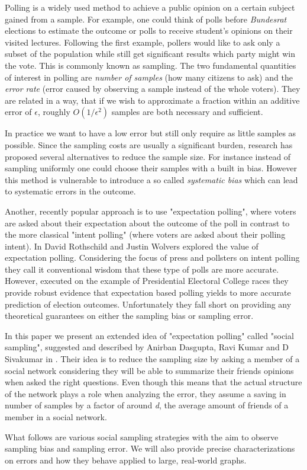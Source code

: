 Polling is a widely used method to achieve a public opinion on a certain subject gained from a sample. For example, one could think of polls before \textit{Bundesrat} elections to estimate the outcome or polls to receive student's opinions on their visited lectures.
Following the first example, pollers would like to ask only a subset of the population while still get significant results which party might win the vote. This is commonly known as sampling.
The two fundamental quantities of interest in polling are \textit{number of samples} (how many citizens to ask) and the \textit{error rate} (error caused by observing a sample instead of the whole voters). They are related in a way, that if we wish to approximate a fraction within an additive error of $\epsilon$, roughly $O(1/\epsilon^{2})$ samples are both necessary and sufficient.

In practice we want to have a low error but still only require as little samples as possible.
Since the sampling costs are usually a significant burden, research has proposed several alternatives to reduce the sample size.
For instance instead of sampling uniformly one could choose their samples with a built in bias.
However this method is vulnerable to introduce a so called \textit{systematic bias} which can lead to systematic errors in the outcome.

Another, recently popular approach is to use "expectation polling", where voters are asked about their expectation about the outcome of the poll in contrast to the more classical "intent polling" (where voters are asked about their polling intent). In \cite{rothschild2009forecasting} David Rothschild and Justin Wolvers explored the value of expectation polling. Considering the focus of press and pollsters on intent polling they call it conventional wisdom that these type of polls are more accurate. However, executed on the example of Presidential Electoral College races they provide robust evidence that expectation based polling yields to more accurate prediction of election outcomes.
Unfortunately they fall short on providing any theoretical guarantees on either the sampling bias or sampling error.

In this paper we present an extended idea of "expectation polling" called "social sampling", suggested and described by Anirban Dasgupta, Ravi Kumar and D Sivakumar in \cite{dasgupta2012social}.
Their idea is to reduce the sampling size by asking a member of a social network considering they will be able to summarize their friends opinions when asked the right questions.
Even though this means that the actual structure of the network plays a role when analyzing the error, they assume a saving in number of samples by a factor of around \textit{d}, the average amount of friends of a member in a social network.

What follows are various social sampling strategies with the aim to observe sampling bias and sampling error.
We will also provide precise characterizations on errors and how they behave applied to large, real-world graphs.
